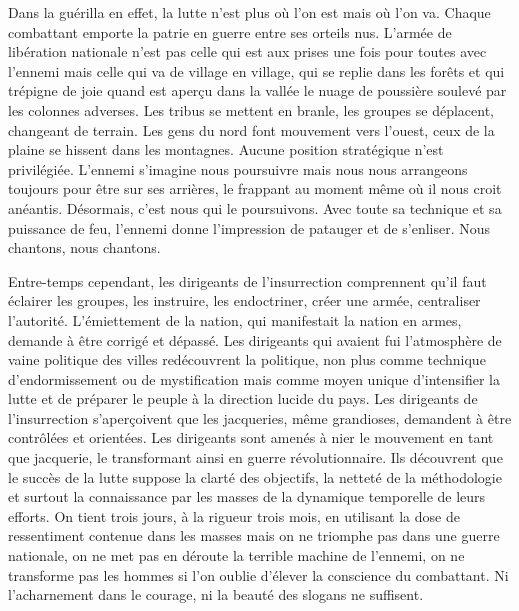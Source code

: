 \documentclass[french,twoside]{book} %
\begin{document}
Dans la guérilla en effet, la lutte n’est plus où l’on est mais où l’on va. Chaque combattant emporte la patrie en guerre entre ses orteils nus. L’armée de libération nationale n’est pas celle qui est aux prises une fois pour toutes avec l’ennemi mais celle qui va de village en village, qui se replie dans les forêts et qui trépigne de joie quand est aperçu dans la vallée le nuage de poussière soulevé par les colonnes adverses. Les tribus se mettent en branle, les groupes se déplacent, changeant de terrain. Les gens du nord font mouvement vers l’ouest, ceux de la plaine se hissent dans les montagnes. Aucune position stratégique n’est privilégiée. L’ennemi s’imagine nous poursuivre mais nous nous arrangeons toujours pour être sur ses arrières, le frappant au moment même où il nous croit anéantis. Désormais, c’est nous qui le poursuivons. Avec toute sa technique et sa puissance de feu, l’ennemi donne l’impression de patauger et de s’enliser. Nous chantons, nous chantons.\par
Entre-temps cependant, les dirigeants de l’insurrection comprennent qu’il faut éclairer les groupes, les instruire, les endoctriner, créer une armée, centraliser l’autorité. L’émiettement de la nation, qui manifestait la nation en armes, demande à être corrigé et dépassé. Les dirigeants qui avaient fui l’atmosphère de vaine politique des villes redécouvrent la politique, non plus   comme technique d’endormissement ou de mystification mais comme moyen unique d’intensifier la lutte et de préparer le peuple à la direction lucide du pays. Les dirigeants de l’insurrection s’aperçoivent que les jacqueries, même grandioses, demandent à être contrôlées et orientées. Les dirigeants sont amenés à nier le mouvement en tant que jacquerie, le transformant ainsi en guerre révolutionnaire. Ils découvrent que le succès de la lutte suppose la clarté des objectifs, la netteté de la méthodologie et surtout la connaissance par les masses de la dynamique temporelle de leurs efforts. On tient trois jours, à la rigueur trois mois, en utilisant la dose de ressentiment contenue dans les masses mais on ne triomphe pas dans une guerre nationale, on ne met pas en déroute la terrible machine de l’ennemi, on ne transforme pas les hommes si l’on oublie d’élever la conscience du combattant. Ni l’acharnement dans le courage, ni la beauté des slogans ne suffisent.\par
\end{document}
